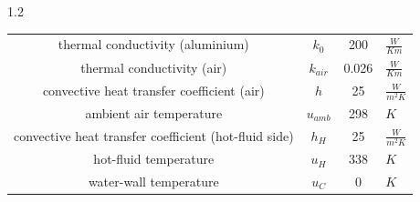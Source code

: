 \documentclass[preview]{standalone}
\begin{document}
\begin{spacing}{1.2}
\begin{tabular}{cccl}
\toprule
thermal conductivity (aluminium) & $k_0$ & 200 & $\frac{W}{K m}$ \\
thermal conductivity (air) & $k_{air}$ & 0.026 & $\frac{W}{K m}$ \\
convective heat transfer coefficient (air) & $h$ & 25 & $\frac{W}{m^2 K}$ \\
ambient air temperature & $u_{amb}$ & 298 & $K$ \\
convective heat transfer coefficient (hot-fluid side) & $h_H$ & 25 & $\frac{W}{m^2 K}$ \\
hot-fluid temperature & $u_H$ & 338 & $K$ \\
water-wall temperature & $u_C$ & 0 & $K$ \\
\bottomrule
\end{tabular}
\end{spacing}
\end{document}
